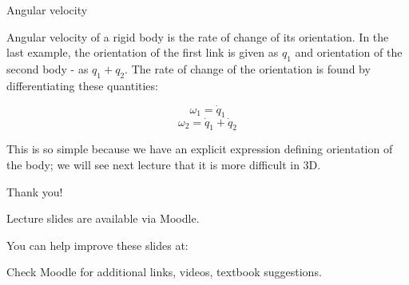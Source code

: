 \documentclass{beamer}
\begin{document}
\begin{frame}{Angular velocity}
	\begin{flushleft}
		
		Angular velocity of a rigid body is the rate of change of its orientation. In the last example, the orientation of the first link is given as $q_1$ and orientation of the second body - as $q_1 + q_2$. The rate of change of the orientation is found by differentiating these quantities:
		
		\begin{equation}
			\omega_1 = \dot q_1
		\end{equation}
		\begin{equation}
			\omega_2 = \dot q_1 + \dot q_2  
		\end{equation}
		
		This is so simple because we have an explicit expression defining orientation of the body; we will see next lecture that it is more difficult in 3D.
		
	\end{flushleft}
\end{frame}




\begin{frame}{Thank you!}
\centerline{Lecture slides are available via Moodle.}
\bigskip
\centerline{You can help improve these slides at:}
\centerline{\mygit}
\bigskip
\centerline{Check Moodle for additional links, videos, textbook suggestions.}
\bigskip

\centerline{\textcolor{black}{}}

\end{frame}
\end{document}
